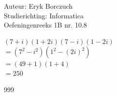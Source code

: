 \documentclass[a4paper]{article}
\begin{document}
  
\noindent \large Auteur: Eryk Borczuch \\
\noindent \large Studierichting: Informatica\\
\noindent \large Oefeningenreeks 1B nr. 10.8\\

\medskip

\normalsize

$(7+i)(1+2i)(7-i)(1-2i)$\\

$= (7^2-i^2)(1^2 - (2i)^2)$\\

$= (49+1)(1+4)$\\

$= 250$\\


\begin{thebibliography}{999}
\end{thebibliography}
\end{document}
